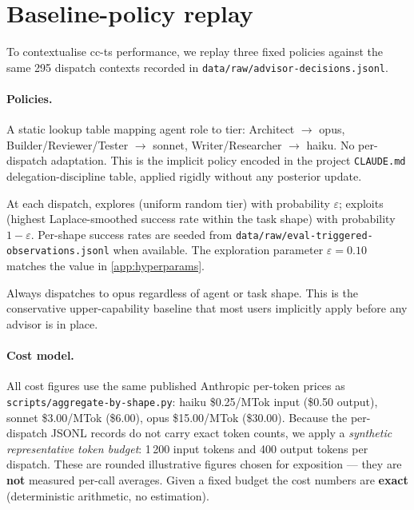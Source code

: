 \section{Baseline-policy replay}
\label{sec:baseline-replay}
\label{app:baselines}

To contextualise cc-ts performance, we replay three fixed policies
against the same 295 dispatch contexts recorded in
\texttt{data/raw/advisor-decisions.jsonl}.

\paragraph{Policies.}

\begin{description}[leftmargin=*]
  \item[static-fm.]  A static lookup table mapping agent role to tier:
        Architect $\to$ opus, Builder/Reviewer/Tester $\to$ sonnet,
        Writer/Researcher $\to$ haiku.  No per-dispatch adaptation.
        This is the implicit policy encoded in the project \texttt{CLAUDE.md}
        delegation-discipline table, applied rigidly without any
        posterior update.

  \item[$\varepsilon$-greedy ($\varepsilon = 0.10$).]  At each dispatch,
        explores (uniform random tier) with probability $\varepsilon$;
        exploits (highest Laplace-smoothed success rate within the task
        shape) with probability $1 - \varepsilon$.  Per-shape success rates
        are seeded from \texttt{data/raw/eval-triggered-observations.jsonl}
        when available.  The exploration parameter $\varepsilon = 0.10$
        matches the value in \cref{app:hyperparams}.

  \item[opus-default.]  Always dispatches to opus regardless of agent or
        task shape.  This is the conservative upper-capability baseline
        that most users implicitly apply before any advisor is in place.
\end{description}

\paragraph{Cost model.}
All cost figures use the same published Anthropic per-token prices as
\texttt{scripts/aggregate-by-shape.py}: haiku \$0.25/MTok input
(\$0.50 output), sonnet \$3.00/MTok (\$6.00), opus \$15.00/MTok
(\$30.00).  Because the per-dispatch JSONL records do not carry exact
token counts, we apply a \emph{synthetic representative token budget}:
1\,200 input tokens and 400 output tokens per dispatch.  These are
rounded illustrative figures chosen for exposition — they are \textbf{not}
measured per-call averages.  Given a fixed budget the cost numbers are
\textbf{exact} (deterministic arithmetic, no estimation).


